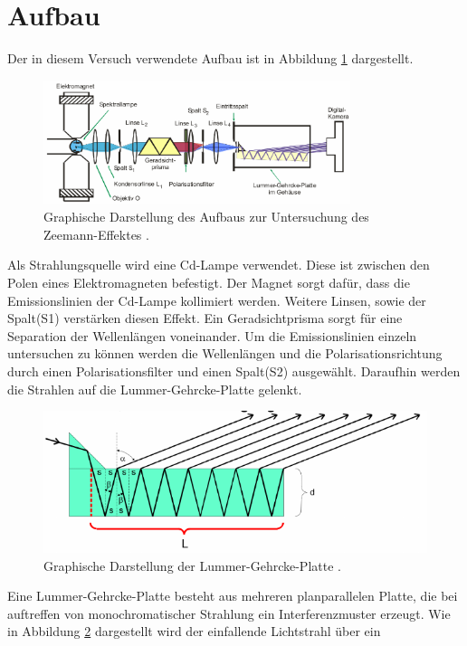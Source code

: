\newpage
\section{Aufbau}
\label{sec:Aufbau}
Der in diesem Versuch verwendete Aufbau ist in Abbildung \ref{abb:aufbau} dargestellt.
\begin{figure}[htb]
  \centering
  \includegraphics[width=0.8\textwidth]{images/V27_7.pdf}
  \caption{Graphische Darstellung des Aufbaus zur Untersuchung des Zeemann-Effektes \cite{anleitung}.}
  \label{abb:aufbau}
\end{figure}
Als Strahlungsquelle wird eine Cd-Lampe verwendet. Diese ist zwischen den Polen
eines Elektromagneten befestigt. Der Magnet sorgt dafür, dass die Emissionslinien
der Cd-Lampe kollimiert werden. Weitere Linsen, sowie der Spalt(S1) verstärken
diesen Effekt. Ein
Geradsichtprisma sorgt für eine Separation der Wellenlängen voneinander. Um
die Emissionslinien einzeln untersuchen zu können werden die Wellenlängen und die
Polarisationsrichtung durch einen Polarisationsfilter und einen Spalt(S2) ausgewählt.
Daraufhin werden die Strahlen auf die Lummer-Gehrcke-Platte gelenkt.
\begin{figure}[htb]
  \centering
  \includegraphics{images/V27_6.pdf}
  \caption{Graphische Darstellung der Lummer-Gehrcke-Platte \cite{anleitung}.}
  \label{abb:lummer}
\end{figure}
Eine Lummer-Gehrcke-Platte besteht aus mehreren planparallelen Platte, die bei
auftreffen von monochromatischer Strahlung ein Interferenzmuster erzeugt. Wie in
Abbildung \ref{abb:lummer} dargestellt wird der einfallende Lichtstrahl über ein
